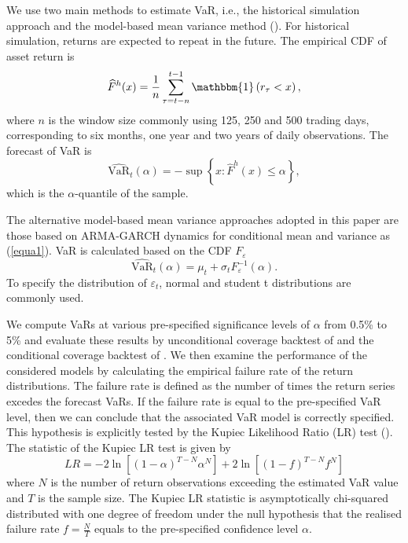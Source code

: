 \documentclass[preprint,12pt,authoryear]{elsarticle}
\begin{document}
We use two main methods to estimate VaR, i.e., the historical simulation approach and the model-based mean variance method (\cite{Chen2019}).
For historical simulation, returns are expected to repeat in the future.
The empirical CDF of asset return is
\begin{equation}
	\widehat{F}^h(x)=\frac{1}{n} \sum_{\tau=t-n}^{t-1}\mathbbm{1}\left(r_{\tau}<x\right),
\end{equation}
where $n$ is the window size commonly using 125, 250 and 500 trading days, corresponding to six months, one year and two years of daily observations. The forecast of VaR is
\begin{equation}
	\widehat{\mathrm{VaR}}_{t}(\alpha)=-\sup\left\{x: \widehat{F}^h(x)\le\alpha\right\},
\end{equation}
which is the $\alpha$-quantile of the sample.

The alternative model-based mean variance approaches adopted in this paper are those based on ARMA-GARCH dynamics for conditional mean and variance as (\ref{equa1}).
VaR is calculated based on the CDF $F_\varepsilon$
\begin{equation}
	\widehat{\mathrm{VaR}}_{t}(\alpha)=\mu_t+\sigma_{t}F_\varepsilon^{-1}(\alpha).
\end{equation}
To specify the distribution of $\varepsilon_t$, normal and student t distributions are commonly used.

We compute VaRs at various pre-specified significance levels of $\alpha$ from 0.5\% to 5\% and evaluate these results by unconditional coverage backtest of \cite{Kupiec1995} and the conditional coverage backtest of \cite{Engle2004}. We then examine the performance of the considered models by calculating the empirical failure rate of the return distributions.
The failure rate is defined as the number of times the return series excedes the forecast VaRs. If the failure rate is equal to the pre-specified VaR level, then we can conclude that the associated VaR model is correctly specified.
This hypothesis is explicitly tested by the Kupiec Likelihood Ratio (LR) test (\cite{Kupiec1995}). The statistic of the Kupiec LR test is given by
\begin{equation}
	LR=-2\ln\left[\left(1-\alpha\right)^{T-N}\alpha^N\right]+2\ln\left[\left(1-f\right)^{T-N}f^N\right]
\end{equation}
where $N$ is the number of return observations exceeding the estimated VaR value and $T$ is the sample size. The Kupiec LR statistic is asymptotically chi-squared distributed with one degree of freedom under the null hypothesis that the realised failure rate $f=\frac NT$ equals to the pre-specified confidence level $\alpha$.
\end{document}
